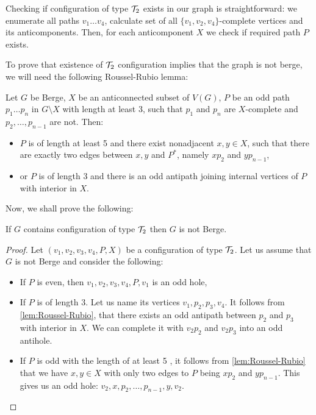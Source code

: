 \documentclass{report}
\begin{document}
Checking if configuration of type $\mathcal{T}_2$ exists in our graph is straightforward: we enumerate all paths $v_1\ldots v_4$, calculate set of all $\{v_1, v_2, v_4\}$-complete vertices and its anticomponents. Then, for each anticomponent $X$ we check if required path $P$ exists.

To prove that existence of $\mathcal{T}_2$ configuration implies that the graph is not berge, we will need the following Roussel-Rubio lemma:

\begin{lemma}\label{lem:Roussel-Rubio}
	Let $G$ be Berge, $X$ be an anticonnected subset of $V(G)$, $P$ be an odd path $p_1\ldots p_n$ in $G\setminus X$ with length at least 3, such that $p_1$ and $p_n$ are $X$-complete and $p_2, \ldots, p_{n-1}$ are not. Then:
	\begin{itemize}
		\item $P$ is of length at least 5 and there exist nonadjacent $x, y \in X$, such that there are exactly two edges between $x, y$ and $P^*$, namely $xp_2$ and $yp_{n-1}$,
		\item or $P$ is of length 3 and there is an odd antipath joining internal vertices of $P$ with interior in $X$.
	\end{itemize}
\end{lemma}

Now, we shall prove the following:

\begin{lemma}
	If $G$ contains configuration of type $\mathcal{T}_2$ then $G$ is not Berge.
\end{lemma}
\begin{proof}
	Let $(v_1, v_2, v_3, v_4, P, X)$ be a configuration of type $\mathcal{T}_2$. Let us assume that $G$ is not Berge and consider the following:
	\begin{itemize}
		\item If $P$ is even, then $v_1, v_2, v_3, v_4, P, v_1$ is an odd hole,
		\item If $P$ is of length 3.  Let us name its vertices $v_1, p_2, p_3, v_4$. It follows from \cref{lem:Roussel-Rubio}, that there exists an odd antipath between $p_2$ and $p_3$ with interior in $X$. We can complete it with $v_2p_2$ and $v_2p_3$ into an odd antihole.
		\item If $P$ is odd with the length of at least 5 , it follows from \cref{lem:Roussel-Rubio} that we have $x, y \in X$ with only two edges to $P$ being $xp_2$ and $yp_{n-1}$. This gives us an odd hole: $v_2, x, p_2, \ldots, p_{n-1}, y, v_2$.
	\end{itemize}
\end{proof}
\end{document}
